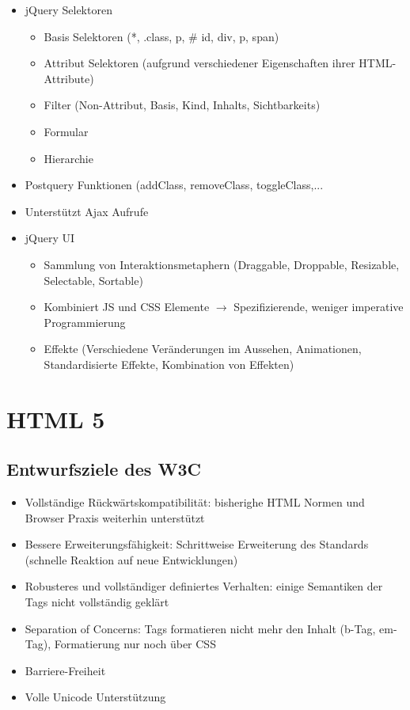 \documentclass{article} %
\begin{document}
\begin{itemize}
\begin{itemize}
			\end{itemize}
			\item jQuery Selektoren
			\begin{itemize}
				\item Basis Selektoren (*, .class, p, \# id, div, p, span)
				\item Attribut Selektoren (aufgrund verschiedener Eigenschaften ihrer HTML-Attribute)
				\item Filter (Non-Attribut, Basis, Kind, Inhalts, Sichtbarkeits)
				\item Formular
				\item Hierarchie
			\end{itemize}
			\item Postquery Funktionen (addClass, removeClass, toggleClass,...
			\item Unterstützt Ajax Aufrufe
			\item jQuery UI
			\begin{itemize}
				\item Sammlung von Interaktionsmetaphern (Draggable, Droppable, Resizable, Selectable, Sortable)
				\item Kombiniert JS und CSS Elemente $\rightarrow$ Spezifizierende, weniger imperative Programmierung
				\item Effekte (Verschiedene Veränderungen im Aussehen, Animationen, Standardisierte Effekte, Kombination von Effekten)
			\end{itemize}
		\end{itemize}		
\section{HTML 5}
	\subsection{Entwurfsziele des W3C }
	\begin{itemize}
		\item Vollständige Rückwärtskompatibilität: bisherighe HTML Normen und Browser Praxis weiterhin unterstützt
		\item Bessere Erweiterungsfähigkeit: Schrittweise Erweiterung des Standards (schnelle Reaktion auf neue Entwicklungen)
		\item Robusteres und vollständiger definiertes Verhalten: einige Semantiken der Tags nicht vollständig geklärt
		\item Separation of Concerns: Tags formatieren nicht mehr den Inhalt (b-Tag, em-Tag), Formatierung nur noch über CSS
		\item Barriere-Freiheit
		\item Volle Unicode Unterstützung
	\end{itemize}
\end{document}
